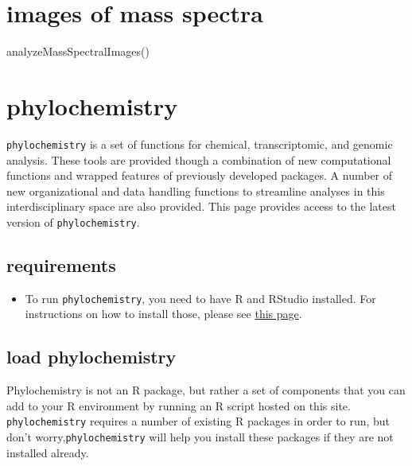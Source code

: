 \documentclass[
]{krantz}
\newenvironment{Shaded}{\begin{snugshade}}{\end{snugshade}}
\newcommand{\FunctionTok}[1]{\textcolor[rgb]{0.00,0.00,0.00}{#1}}
\newcommand{\NormalTok}[1]{#1}
\providecommand{\tightlist}{%
  \setlength{\itemsep}{0pt}\setlength{\parskip}{0pt}}
\begin{document}
\hypertarget{images-of-mass-spectra}{%
\section{images of mass spectra}\label{images-of-mass-spectra}}

\begin{Shaded}
\begin{Highlighting}[]
\FunctionTok{analyzeMassSpectralImages}\NormalTok{()}
\end{Highlighting}
\end{Shaded}

\hypertarget{phylochemistry-1}{%
\section{phylochemistry}\label{phylochemistry-1}}

\texttt{phylochemistry} is a set of functions for chemical, transcriptomic, and genomic analysis. These tools are provided though a combination of new computational functions and wrapped features of previously developed packages. A number of new organizational and data handling functions to streamline analyses in this interdisciplinary space are also provided. This page provides access to the latest version of \texttt{phylochemistry}.

\hypertarget{requirements}{%
\subsection{requirements}\label{requirements}}

\begin{itemize}
\tightlist
\item
  To run \texttt{phylochemistry}, you need to have R and RStudio installed. For instructions on how to install those, please see \href{https://thebustalab.github.io/R_For_Chemists/installation.html}{this page}.
\end{itemize}

\hypertarget{load-phylochemistry}{%
\subsection{load phylochemistry}\label{load-phylochemistry}}

Phylochemistry is not an R package, but rather a set of components that you can add to your R environment by running an R script hosted on this site. \texttt{phylochemistry} requires a number of existing R packages in order to run, but don't worry,\texttt{phylochemistry} will help you install these packages if they are not installed already.
\end{document}
